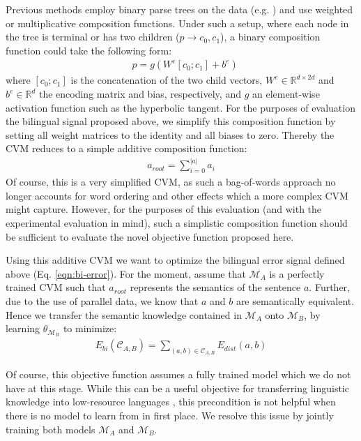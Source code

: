 \documentclass{article} \pdfoutput=1
\newcommand{\CVM}{\textsc{CVM}\xspace}
\begin{document}
Previous methods employ binary parse trees on the data (e.g. \cite{Hermann:2013:ACL,Socher:2012}) and use weighted or multiplicative composition functions.
Under such a setup, where each node in the tree is terminal or has two children ($p \rightarrow c_0,c_1$), a binary composition function could take the following form:
\begin{align}
&p = g\left(W^e [c_0;c_1] + b^e \right) \label{eq:encoding}
\end{align}
where $[c_0;c_1]$ is the concatenation of the two child vectors, $W^e \in
\mathbb{R}^{d\times 2d}$ and $b^e \in \mathbb{R}^d$ the encoding matrix and bias, respectively, and $g$ an element-wise activation function such as the hyperbolic tangent.
For the purposes of evaluation the bilingual signal proposed above, we simplify this composition function by setting all weight matrices to the identity and all biases to zero.
Thereby the \CVM reduces to a simple additive composition function:
\begin{align}
a_{root} = \sum_{i=0}^{|a|} a_i
\end{align}
Of course, this is a very simplified \CVM, as such a bag-of-words approach no
longer accounts for word ordering and other effects which a more complex \CVM
might capture. However, for the purposes of this evaluation (and with the
experimental evaluation in mind), such a simplistic composition function should
be sufficient to evaluate the novel objective function proposed here.

Using this additive \CVM we want to optimize the bilingual error signal defined above (Eq. \ref{eqn:bi-error}).
For the moment, assume that $\mathcal{M}_A$ is a perfectly trained \CVM such that $a_{root}$ represents the semantics of the sentence $a$.
Further, due to the use of parallel data, we know that $a$ and $b$ are semantically equivalent.
Hence we transfer the semantic knowledge contained in $\mathcal{M}_A$ onto $\mathcal{M}_B$, by learning $\theta_{\mathcal{M}_B}$ to minimize:
\begin{align}
E_{bi}(\mathcal{C}_{A,B}) = \sum_{(a,b) \in \mathcal{C}_{A,B}} E_{dist}(a,b)
\end{align}

Of course, this objective function assumes a fully trained model which we do not have at this stage.
While this can be a useful objective for transferring linguistic knowledge into low-resource languages \cite{Klementiev:2012}, this precondition is not helpful when there is no model to learn from in first place.
We resolve this issue by jointly training both models $\mathcal{M}_A$ and $\mathcal{M}_B$.
\end{document}
